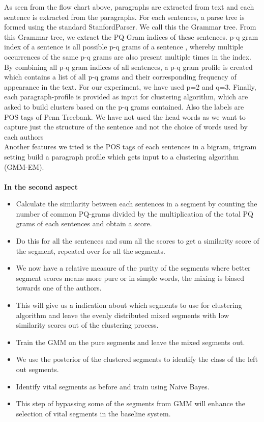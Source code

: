 \documentclass[letterpaper]{article}
\begin{document}
As seen from the flow chart above, paragraphs are extracted from text and each sentence is extracted from the paragraphs. For each sentences, a parse tree is formed using the standard StanfordParser. We call this the Grammar tree. From this Grammar tree, we extract the PQ Gram indices of these sentences. p-q gram index of a sentence is all possible p-q grams of a sentence , whereby multiple occurrences of the same p-q grams are also present multiple times in the index. By combining all p-q gram indices of all sentences, a p-q gram profile is created which contains a list of all p-q grams and their corresponding frequency of appearance in the text.
For our experiment, we have used p=2 and q=3. Finally, each paragraph-profile is provided as input for clustering algorithm, which are asked to build clusters based on the p-q grams contained. Also the labels are POS tags of Penn Treebank. We have not used the head words as we want to capture just the structure of the sentence and not the choice of words used by each authors\\
Another features we tried is the POS tags of each sentences in a bigram, trigram setting build a paragraph profile which gets input to a clustering algorithm (GMM-EM).\\
\\
\textbf{In the second aspect}
\begin{itemize}
\item Calculate the similarity between each sentences in a segment by counting the number of common PQ-grams divided by the multiplication of the total PQ grams of each sentences and obtain a score.
\item Do this for all the sentences and sum all the scores to get a similarity score of the segment, repeated over for all the segments.
\item We now have a relative measure of the purity of the segments where better segment scores means more pure or in simple words, the mixing is biased towards one of the authors.
\item This will give us a indication about which segments to use for clustering algorithm and leave the evenly distributed mixed segments with low similarity scores out of the clustering process.
\item Train the GMM on the pure segments and leave the mixed segments out.
\item We use the posterior of the clustered segments to identify the class of the left out segments. 
\item Identify vital segments as before and train using Naive Bayes.
\item This step of bypassing some of the segments from GMM will enhance the selection of vital segments in the baseline system.
\end{itemize}
\end{document}
